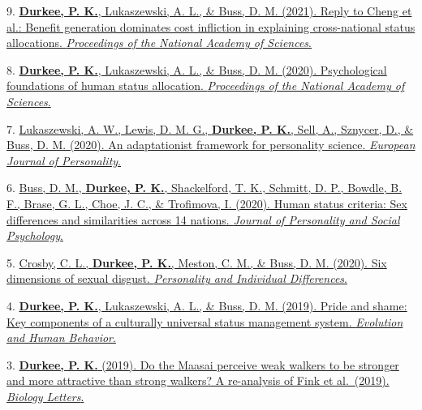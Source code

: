 \documentclass[10pt,]{article}
\begin{document}
9. \hangindent=0.5in
\href{http://www.pdurkee.com/files/pubs/DurkeeReply_2021.pdf}{\textbf{Durkee,
P. K.}, Lukaszewski, A. L., \& Buss, D. M. (2021). Reply to Cheng et
al.: Benefit generation dominates cost infliction in explaining
cross-national status allocations. \emph{Proceedings of the National
Academy of Sciences}.\textsuperscript{\faFileTextO}}

8. \hangindent=0.5in
\href{http://www.pdurkee.com/files/pubs/DurkeeLukaszewskiBuss2020_PsychologicalFoundationsofHumanStatusAllocation.pdf}{\textbf{Durkee,
P. K.}, Lukaszewski, A. L., \& Buss, D. M. (2020). Psychological
foundations of human status allocation. \emph{Proceedings of the
National Academy of Sciences}.\textsuperscript{\faFileTextO}}

7. \hangindent=0.5in
\href{http://www.pdurkee.com/files/pubs/AnAdaptationistFrameworkPersonality.pdf}{Lukaszewski,
A. W., Lewis, D. M. G., \textbf{Durkee, P. K.}, Sell, A., Sznycer, D.,
\& Buss, D. M. (2020). An adaptationist framework for personality
science. \emph{European Journal of
Personality}.\textsuperscript{\faFileTextO}}

6. \hangindent=0.5in
\href{http://www.pdurkee.com/files/pubs/Buss\&Durkee_etal_HumanStatusCriteria.pdf}{Buss,
D. M.\textsuperscript{\faUnsorted}, \textbf{Durkee, P.
K.}\textsuperscript{\faUnsorted}, Shackelford, T. K., Schmitt, D. P.,
Bowdle, B. F., Brase, G. L., Choe, J. C., \& Trofimova, I. (2020). Human
status criteria: Sex differences and similarities across 14 nations.
\emph{Journal of Personality and Social
Psychology}.\textsuperscript{\faFileTextO}}

5. \hangindent=0.5in
\href{https://labs.la.utexas.edu/mestonlab/files/2019/12/1-s2.0-S0191886919306543-main.pdf}{Crosby,
C. L., \textbf{Durkee, P. K.}, Meston, C. M., \& Buss, D. M. (2020). Six
dimensions of sexual disgust. \emph{Personality and Individual
Differences}.\textsuperscript{\faFileTextO}}

4. \hangindent=0.5in
\href{http://www.pdurkee.com/files/pubs/DurkeeLukaszewskiBuss_PrideShame_2019.pdf}{\textbf{Durkee,
P. K.}, Lukaszewski, A. L., \& Buss, D. M. (2019). Pride and shame: Key
components of a culturally universal status management system.
\emph{Evolution and Human Behavior}.\textsuperscript{\faFileTextO}}

3. \hangindent=0.5in
\href{http://www.pdurkee.com/files/pubs/Durkee_2019.pdf}{\textbf{Durkee,
P. K.} (2019). Do the Maasai perceive weak walkers to be stronger and
more attractive than strong walkers? A re-analysis of Fink et
al.~(2019). \emph{Biology Letters}.\textsuperscript{\faFileTextO}}
\end{document}
